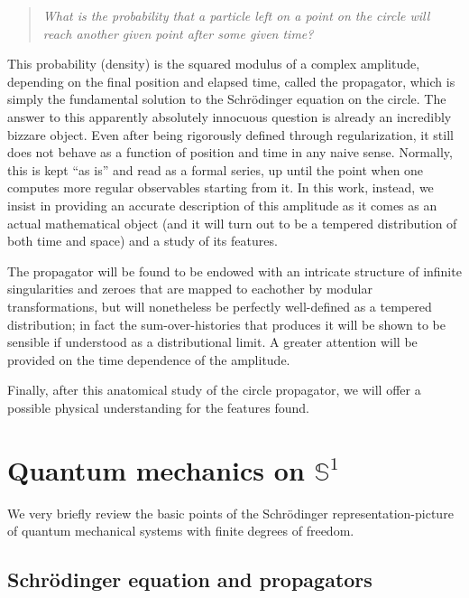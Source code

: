 \documentclass{article}
\newcommand{\ess}{\ensuremath{\mathbb{S}}}
\begin{document}
\vspace{2em}

\begin{quote} \emph{What is the probability that a particle left on a point on the circle will reach another given point after some given time?} \end{quote}

\vspace{2em}

This probability (density) is the squared modulus of a complex amplitude, depending on the final position and elapsed time, called the propagator, which is simply the fundamental solution to the Schr\"odinger equation on the circle. The answer to this apparently absolutely innocuous question is already an incredibly bizzare object. Even after being rigorously defined through regularization, it still does not behave as a function of position and time in any naive sense. Normally, this is kept ``as is'' and read as a formal series, up until the point when one computes more regular observables starting from it. In this work, instead, we insist in providing an accurate description of this amplitude as it comes as an actual mathematical object (and it will turn out to be a tempered distribution of both time and space) and a study of its features.

The propagator will be found to be endowed with an intricate structure of infinite singularities and zeroes that are mapped to eachother by modular transformations, but will nonetheless be perfectly well-defined as a tempered distribution; in fact the sum-over-histories that produces it will be shown to be sensible if understood as a distributional limit. A greater attention will be provided on the time dependence of the amplitude.

Finally, after this anatomical study of the circle propagator, we will offer a possible physical understanding for the features found.

\section{Quantum mechanics on $\ess^1$}

We very briefly review the basic points of the Schr\"odinger representation-picture of quantum mechanical systems with finite degrees of freedom.

\subsection{Schr\"odinger equation and propagators}
\end{document}
